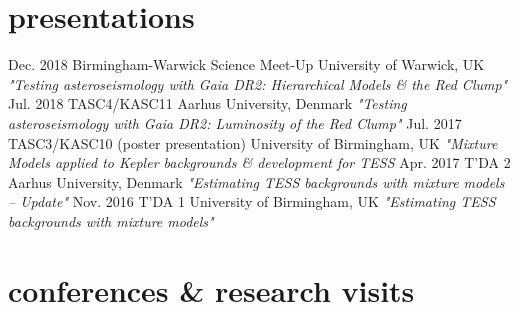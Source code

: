 \documentclass[]{k-cv} %
\begin{document}
\clearpage



\section{presentations}

\begin{entrylist}
\entry
{Dec. 2018}
{Birmingham-Warwick Science Meet-Up}
{University of Warwick, UK}
{\emph{"Testing asteroseismology with \textit{Gaia} DR2: Hierarchical Models \& the Red Clump"}}
\entry
{Jul. 2018}
{TASC4/KASC11}
{Aarhus University, Denmark}
{\emph{"Testing asteroseismology with \textit{Gaia} DR2: Luminosity of the Red Clump"}}
\entry
{Jul. 2017}
{TASC3/KASC10 (poster presentation)}
{University of Birmingham, UK}
{\emph{"Mixture Models applied to \emph{Kepler} backgrounds \& development for TESS}}
\entry
{Apr. 2017}
{T'DA 2}
{Aarhus University, Denmark}
{\emph{"Estimating TESS backgrounds with mixture models -- Update"}}
\entry
{Nov. 2016}
{T'DA 1}
{University of Birmingham, UK}
{\emph{"Estimating TESS backgrounds with mixture models"}}
\end{entrylist}

\section{conferences \& research visits}
\end{document}
